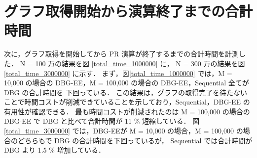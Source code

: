 \section{グラフ取得開始から演算終了までの合計時間}
次に，グラフ取得を開始してから PR 演算が終了するまでの合計時間を計測した．
N = 100 万の結果を図 \ref{total_time_1000000} に，
N = 300 万の結果を図 \ref{total_time_3000000} に示す．
まず，図\ref{total_time_1000000} では，M = 10,000 の場合の DBG-EE，M = 100,000 の場合の DBG-EE，Sequential 全てが DBG の合計時間を
下回っている．
この結果は，グラフの取得完了を待たないことで時間コストが削減できていることを示しており，Sequential，DBG-EE の有用性が確認できる．
最も時間コストが削減されたのは M = 100,000 の場合の DBG-EE で DBG と比べて合計時間が 11 \% 短縮している．
図 \ref{total_time_3000000} では，DBG-EEが M = 10,000 の場合，M = 100,000 の場合のどちらもで DBG の合計時間を下回っているが，
Sequential では合計時間が DBG より 1.5 \% 増加している． 

